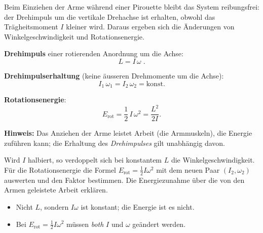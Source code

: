 
Beim Einziehen der Arme während einer Pirouette bleibt das System reibungsfrei:
der Drehimpuls um die vertikale Drehachse ist erhalten, obwohl das
Trägheitsmoment $I$ kleiner wird. Daraus ergeben sich die Änderungen von
Winkelgeschwindigkeit und Rotationsenergie.

\begin{werkzeugkasten}[Werkzeuge]
\textbf{Drehimpuls} einer rotierenden Anordnung um die Achse:
\begin{equation}
  L = I\,\omega\;.
\end{equation}

\textbf{Drehimpulserhaltung} (keine äusseren Drehmomente um die Achse):
\begin{equation}
  I_1\,\omega_1 = I_2\,\omega_2 = \mathrm{konst}.
\end{equation}

\textbf{Rotationsenergie}:
\begin{equation}
  E_\mathrm{rot} = \frac12\,I\,\omega^2
  = \frac{L^2}{2I}.
\end{equation}

\textbf{Hinweis:} Das Anziehen der Arme leistet Arbeit (die Armmuskeln), die
Energie zuführen kann; die Erhaltung des \emph{Drehimpulses} gilt unabhängig
davon.
\end{werkzeugkasten}

\begin{werkzeugkasten}
Wird $I$ halbiert, so verdoppelt sich bei konstantem $L$ die
Winkelgeschwindigkeit. Für die Rotationsenergie die Formel $E_\mathrm{rot}
=\frac12 I\omega^2$ mit dem neuen Paar $(I_2,\omega_2)$ auswerten und den
Faktor bestimmen. Die Energiezunahme über die von den Armen geleistete Arbeit
erklären.
\end{werkzeugkasten}

\begin{achtung}
\begin{itemize}
  \item Nicht $L$, sondern $I\omega$ ist konstant; die Energie ist es
       nicht.
  \item Bei $E_\mathrm{rot}=\frac12 I\omega^2$ müssen \emph{both} $I$ und
       $\omega$ geändert werden.
\end{itemize}
\end{achtung}
